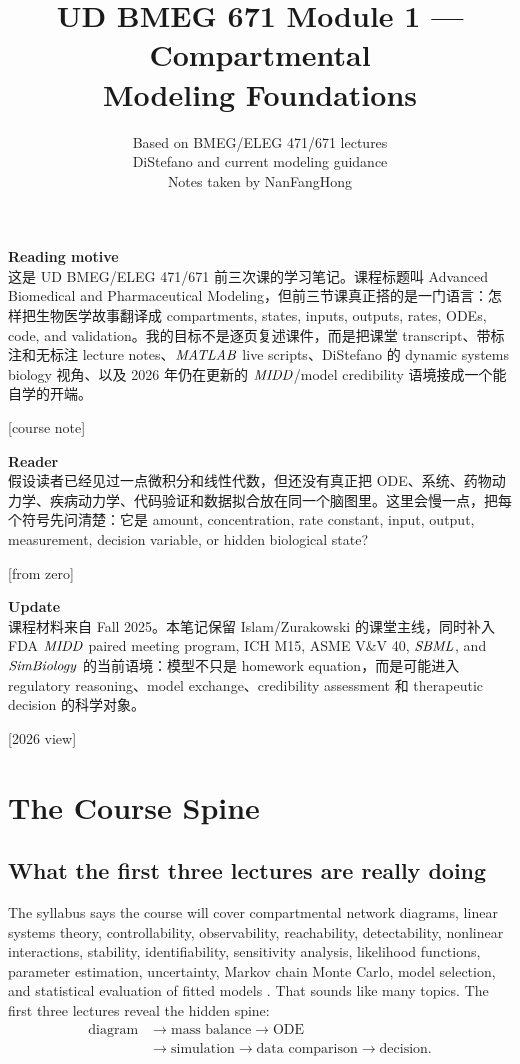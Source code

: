 \documentclass[a4paper]{article}
\title{UD BMEG 671 Module 1 --- Compartmental\\ Modeling Foundations}
\author{Based on BMEG/ELEG 471/671 lectures\\\small DiStefano and current modeling guidance\\\small Notes taken by NanFangHong}
\newcommand{\MIDD}{\ensuremath{\pksym{MIDD}}}
\newcommand{\SBML}{\ensuremath{\pksym{SBML}}}
\newcommand{\MATLAB}{\ensuremath{\pksym{MATLAB}}}
\newcommand{\SimBio}{\ensuremath{\pksym{SimBiology}}}
\begin{document}
\maketitle
{\small
  \noindent\textbf{Reading motive}\\
  这是 UD BMEG/ELEG 471/671 前三次课的学习笔记。课程标题叫 Advanced Biomedical and Pharmaceutical Modeling，但前三节课真正搭的是一门语言：怎样把生物医学故事翻译成 compartments, states, inputs, outputs, rates, ODEs, code, and validation。我的目标不是逐页复述课件，而是把课堂 transcript、带标注和无标注 lecture notes、\MATLAB{} live scripts、DiStefano 的 dynamic systems biology 视角、以及 2026 年仍在更新的 \MIDD{}/model credibility 语境接成一个能自学的开端。\par\hfill[course note]

  \vspace{5pt}
  \noindent\textbf{Reader}\\
  假设读者已经见过一点微积分和线性代数，但还没有真正把 ODE、系统、药物动力学、疾病动力学、代码验证和数据拟合放在同一个脑图里。这里会慢一点，把每个符号先问清楚：它是 amount, concentration, rate constant, input, output, measurement, decision variable, or hidden biological state?\par\hfill[from zero]

  \vspace{5pt}
  \noindent\textbf{Update}\\
  课程材料来自 Fall 2025。本笔记保留 Islam/Zurakowski 的课堂主线，同时补入 FDA \MIDD{} paired meeting program, ICH M15, ASME V\&V 40, \SBML{}, and \SimBio{} 的当前语境：模型不只是 homework equation，而是可能进入 regulatory reasoning、model exchange、credibility assessment 和 therapeutic decision 的科学对象。\par\hfill[2026 view]
}

\tableofcontents

\section{The Course Spine}

\subsection{What the first three lectures are really doing}

The syllabus says the course will cover compartmental network diagrams, linear systems theory, controllability, observability, reachability, detectability, nonlinear interactions, stability, identifiability, sensitivity analysis, likelihood functions, parameter estimation, uncertainty, Markov chain Monte Carlo, model selection, and statistical evaluation of fitted models \cite{bmeg671Syllabus2025}. That sounds like many topics. The first three lectures reveal the hidden spine:
\[
  \begin{aligned}
  \text{diagram}
  &\longrightarrow
  \text{mass balance}
  \longrightarrow
  \text{ODE}\\
  &\longrightarrow
  \text{simulation}
  \longrightarrow
  \text{data comparison}
  \longrightarrow
  \text{decision}.
  \end{aligned}
\]
\end{document}
